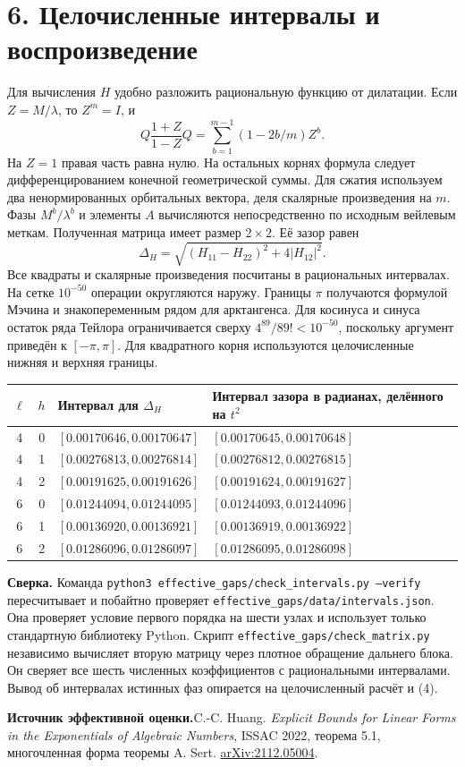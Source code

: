 \documentclass[11pt,a4paper]{article}
\newcommand{\sect}[1]{\section*{\sffamily\color{ink}#1}}
\newcommand{\subt}[1]{\par\medskip\noindent\textbf{#1.}\quad}
\begin{document}
\newpage
\sect{6. Целочисленные интервалы и воспроизведение}
Для вычисления \(H\) удобно разложить рациональную функцию от дилатации. Если \(Z=M/\lambda\), то \(Z^m=I\), и
\[
    Q\frac{1+Z}{1-Z}Q
                  =\sum_{b=1}^{m-1}(1-2b/m) Z^b .
\]
На \(Z=1\) правая часть равна нулю. На остальных корнях формула следует дифференцированием конечной геометрической суммы. Для сжатия используем два ненормированных орбитальных вектора, деля скалярные произведения на \(m\). Фазы \(M^b/\lambda^b\) и элементы \(A\) вычисляются непосредственно по исходным вейлевым меткам. Полученная матрица имеет размер \(2\times2\). Её зазор равен
\[
       \Delta_H=\sqrt{(H_{11}-H_{22})^2+4|H_{12}|^2}.
\]
Все квадраты и скалярные произведения посчитаны в рациональных интервалах. На сетке \(10^{-50}\) операции округляются наружу. Границы \(\pi\) получаются формулой Мэчина и знакопеременным рядом для арктангенса. Для косинуса и синуса остаток ряда Тейлора ограничивается сверху \(4^{89}/89!<10^{-50}\), поскольку аргумент приведён к \([-\pi,\pi]\). Для квадратного корня используются целочисленные нижняя и верхняя границы.

\begin{center}
\begin{tabular}{ccll}
\toprule
\(\ell\)&\(h\)& Интервал для \(\Delta_H\)& Интервал зазора в радианах, делённого на \(t^2\)\\
\midrule
4&0&\([0.00170646,0.00170647]\)&\([0.00170645,0.00170648]\)\\
4&1&\([0.00276813,0.00276814]\)&\([0.00276812,0.00276815]\)\\
4&2&\([0.00191625,0.00191626]\)&\([0.00191624,0.00191627]\)\\
6&0&\([0.01244094,0.01244095]\)&\([0.01244093,0.01244096]\)\\
6&1&\([0.00136920,0.00136921]\)&\([0.00136919,0.00136922]\)\\
6&2&\([0.01286096,0.01286097]\)&\([0.01286095,0.01286098]\)\\
\bottomrule
\end{tabular}
\end{center}

\subt{Сверка}
Команда \texttt{python3 effective\_gaps/check\_intervals.py --verify} пересчитывает и побайтно проверяет \texttt{effective\_gaps/data/intervals.json}. Она проверяет условие первого порядка на шести узлах и использует только стандартную библиотеку Python. Скрипт \texttt{effective\_gaps/check\_matrix.py} независимо вычисляет вторую матрицу через плотное обращение дальнего блока. Он сверяет все шесть численных коэффициентов с рациональными интервалами. Вывод об интервалах истинных фаз опирается на целочисленный расчёт и (4).

\subt{Источник эффективной оценки}
[1] C.-C. Huang. \emph{Explicit Bounds for Linear Forms in the Exponentials of Algebraic Numbers}, ISSAC 2022, теорема 5.1, многочленная форма теоремы A. Sert. \href{https://arxiv.org/abs/2112.05004}{arXiv:2112.05004}.
\end{document}

